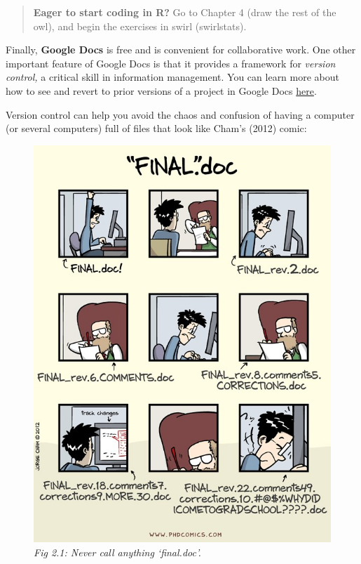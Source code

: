 \documentclass[
  openany]{book}
\begin{document}
\begin{quote}
\textbf{Eager to start coding in R?} Go to Chapter 4 (draw the rest of the owl), and begin the exercises in swirl (swirlstats).
\end{quote}

Finally, \textbf{Google Docs} is free and is convenient for collaborative work. One other important feature of Google Docs is that it provides a framework for \emph{version control,} a critical skill in information management. You can learn more about how to see and revert to prior versions of a project in Google Docs \href{https://sites.google.com/site/scriptsexamples/home/announcements/named-versions-new-version-history-google-docs}{here}.

Version control can help you avoid the chaos and confusion of having a computer (or several computers) full of files that look like Cham's (2012) comic:

\begin{figure}
\centering
\includegraphics{final.jpg}
\caption{\emph{Fig 2.1: Never call anything `final.doc'.}}
\end{figure}
\end{document}
